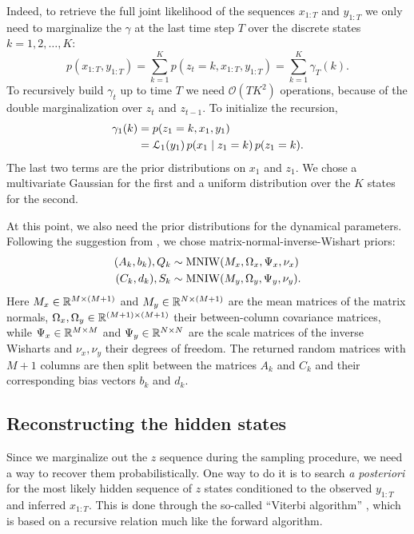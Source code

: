 \documentclass[
  10pt, twocolumn, headings=normal,
  footlines=1, DIV=calc
]{scrartcl}
\begin{document}
Indeed, to retrieve the full joint likelihood of the sequences $x_{1:T}$ and
$y_{1:T}$ we only need to marginalize the $\gamma$ at the last time step $T$
over the discrete states $k = 1, 2, \ldots, K$:
\begin{equation}
  p(x_{1:T}, y_{1:T}) = \sum_{k=1}^{K} p(z_{t} = k, x_{1:T}, y_{1:T})
    = \sum_{k=1}^{K} \gamma_{T} (k).
\end{equation}
To recursively build $\gamma_{t}$ up to time $T$ we need
$\mathcal{O}(TK^{2})$ operations, because of the double marginalization over
$z_{t}$ and $z_{t-1}$. To initialize the recursion,
\begin{equation}
  \begin{split}
    \gamma_{1}(k) &= p(z_{1} = k, x_{1}, y_{1}) \\
                  &= \mathcal{L}_{1}(y_{1}) \,
                    p(x_{1} \;\vert\; z_{1} = k) \, p(z_{1} = k).
  \end{split}
  \label{eq:gamma-1}
\end{equation}
The last two terms are the prior distributions on $x_{1}$ and $z_{1}$. We chose
a multivariate Gaussian for the first and a uniform distribution over the $K$
states for the second. 

At this point, we also need the prior distributions for the dynamical
parameters. Following the suggestion from \textcite{Linderman17}, we chose
matrix-normal-inverse-Wishart priors:
\begin{align}
  (A_{k}, b_{k}), Q_{k} &\sim \operatorname{MNIW}(M_{x}, \Omega_{x}, \Psi_{x}, \nu_{x}) \\
  (C_{k}, d_{k}), S_{k} &\sim \operatorname{MNIW}(M_{y}, \Omega_{y}, \Psi_{y}, \nu_{y}).
\end{align}
Here $M_{x} \in \mathbb{R}^{M \times (M + 1)}$ and $M_{y} \in \mathbb{R}^{N \times (M + 1)}$ are
the mean matrices of the matrix normals, $\Omega_x, \Omega_y \in \mathbb{R}^{(M + 1)
\times (M + 1)}$ their between-column covariance matrices, while $\Psi_x \in
\mathbb{R}^{M \times M}$ and $\Psi_{y} \in \mathbb{R}^{N \times N}$ are the scale matrices of
the inverse Wisharts and $\nu_{x}, \nu_{y}$ their degrees of freedom. The
returned random matrices with $M + 1$ columns are then split between the
matrices $A_{k}$ and $C_{k}$ and their corresponding bias vectors $b_{k}$ and
$d_{k}$.

\subsection{Reconstructing the hidden states}
Since we marginalize out the $z$ sequence during the sampling procedure, we need
a way to recover them probabilistically. One way to do it is to search \emph{a
posteriori} for the most likely hidden sequence of $z$ states conditioned to the
observed $y_{1:T}$ and inferred $x_{1:T}$. This is done through the so-called
\enquote{Viterbi algorithm} \autocite{Stan24}, which is based on a recursive
relation much like the forward algorithm.
\end{document}
